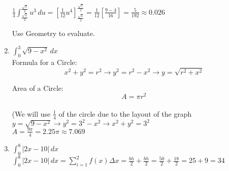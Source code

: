\documentclass[10pt, letterpaper]{report}
\begin{document}
\begin{enumerate}
    $\frac{1}{3}\int_{\frac{\sqrt{2}}{2}}^{\frac{\sqrt{3}}{2}}{u^{3}}\,du=
    [\frac{1}{12}u^4]_{\frac{\sqrt{2}}{2}}^{\frac{\sqrt{3}}{2}}=
    \frac{1}{12}[\frac{9-4}{16}]=\frac{5}{192}\approx0.026$ \\
\pagebreak
  \par Use Geometry to evaluate. \\
  \item{$\int_{0}^{3}{\sqrt{9-x^{2}}}\,dx$} \\

    Formula for a Circle: \[ x^{2}+y^{2}=r^{2}\rightarrow
    y^{2}=r^{2}-x^{2}\rightarrow y=\sqrt{r^{2}+x^{2}}\]

    Area of a Circle: \[ A=\pi r^2 \] \\

    (We will use $\frac{1}{4}$ of the circle due to the layout of the graph \\

    $y=\sqrt{9-x^{2}}\rightarrow
    y^{2}=3^{2}-x^{2}\rightarrow
    x^{2}+y^{2}=3^{2}$ \\

    $A=\frac{9\pi}{4}=2.25\pi\approx7.069$ \\

  \item{$\int_{0}^{8}{|2x-10|}\,dx$} \\

    $\int_{0}^{8}{|2x-10|}\,dx=
    \sum_{i=1}^{2}{f(x)}\Delta x=
    \frac{bh}{2}+\frac{bh}{2}=
    \frac{50}{2}+\frac{18}{2}=25+9=34$ \\

\end{enumerate}
\end{document}
